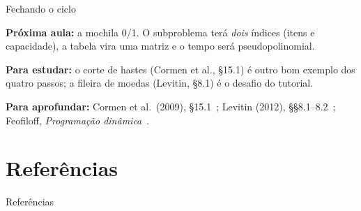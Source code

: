 \documentclass[aspectratio=169,xcolor=table]{beamer}
\newcommand{\fonte}[1]{%
  \vfill
  {\tiny\color{gray!55!black}\textbf{Para aprofundar:} #1\par}%
}
\begin{document}
\begin{frame}{Fechando o ciclo}
  \begin{center}
  \end{center}
  \medskip
  {\scriptsize
  \textbf{Próxima aula:} a mochila 0/1. O subproblema terá \emph{dois} índices (itens e
  capacidade), a tabela vira uma matriz e o tempo será pseudopolinomial.
  \smallskip

  \textbf{Para estudar:} o corte de hastes (Cormen et al., \S 15.1) é outro bom exemplo dos
  quatro passos; a fileira de moedas (Levitin, \S 8.1) é o desafio do tutorial.}
  \fonte{Cormen et al.\ (2009), \S 15.1~\cite{cormen2009introduction};
    Levitin (2012), \S\S 8.1--8.2~\cite{levitin2012introduction};
    Feofiloff, \emph{Programação dinâmica}~\cite{feofiloff2024programacao}.}
\end{frame}

\section*{Referências}
\begin{frame}[allowframebreaks]{Referências}
  \tiny
  \nocite{cormen2009introduction,cormen2012algoritmos,kleinberg2006algorithm,levitin2012introduction,dasgupta2008algorithms,feofiloff2024programacao,bellman1957dynamic,dreyfus2002richard,michie1968memo}
  
  
\end{frame}
\end{document}
